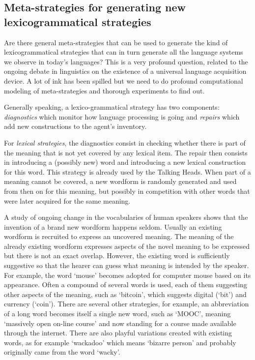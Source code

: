 \subsection{Meta-strategies for generating new lexico\-gram\-matical strategies}

Are there general meta-strategies that can be used to generate the kind of lexico\-gram\-mat\-ical strategies 
that can in turn generate all the language systems we observe 
in today's languages? This is a very profound question, related to the ongoing debate in linguistics on the existence of 
a universal language acquisition device. A lot of ink has been spilled but we need to do profound computational modeling 
of meta-strategies and thorough experiments to find out. 

Generally speaking, a lexico-grammatical strategy has two components: {\itshape diagnostics} which monitor how 
language processing is going and {\itshape repairs} which add new 
constructions to the agent's inventory. 

For {\itshape lexical strategies}, the diagnostics consist in checking whether there is part 
of the meaning that is not yet covered by any lexical item. The repair then consists in introducing 
a (possibly new) word and introducing a new lexical construction for this word. 
This strategy is already used by the Talking Heads. When part of a meaning cannot be covered, a new wordform is randomly generated
and used from then on for this meaning, but possibly in competition with other words that were later acquired for the same 
meaning. 

A study of ongoing change in the vocabularies of human speakers shows that the invention of a brand new wordform happens seldom. 
Usually an existing wordform is recruited to express an uncovered meaning. The meaning of the already existing wordform
expresses aspects of the novel meaning to be expressed but there is not an exact overlap. However, the existing word is sufficiently 
suggestive so that the hearer can guess what meaning is intended by the speaker. For example, the word `mouse' becomes 
adopted for computer mouse based on its appearance. Often a compound of several words is used, each of them suggesting 
other aspects of the meaning, such as `bitcoin', which suggests digital (`bit') and currency (`coin').  
There are several other strategies, for example, an abbreviation of a long word becomes itself a single new word, 
such as `MOOC', meaning `massively open on-line course' and now standing for a course made available through the internet. 
There are also playful variations created with existing words, as for example
`wackadoo' which means `bizarre person' and probably originally came from the word `wacky'. 

